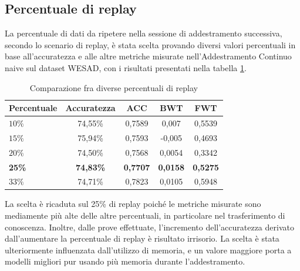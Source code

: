 \subsection{Percentuale di replay}
La percentuale di dati da ripetere nella sessione di addestramento successiva, secondo lo scenario di replay, è stata scelta provando diversi valori percentuali in base all'accuratezza e alle altre metriche misurate nell'Addestramento Continuo naive sul dataset WESAD, con i risultati presentati nella tabella \ref{tab:replayperctest}.\\
\begin{table}[h]
    \begin{center}
        \begin{tabular}{l|c|c|c|c}
            \textbf{Percentuale} & \textbf{Accuratezza} & \textbf{ACC} & \textbf{BWT} & \textbf{FWT}\\
            \hline
            $10\%$ & 74,55\% & 0,7589 & 0,007 & 0,5539\\
            $15\%$ & 75,94\% & 0,7593 & -0,005 & 0,4693\\
            $20\%$ & 74,50\% & 0,7568 & 0,0054 & 0,3342\\
            \textbf{25\%} & \textbf{74,83\%} & \textbf{0,7707} & \textbf{0,0158} & \textbf{0,5275}\\
            $33\%$ & 74,71\% & 0,7823 & 0,0105 & 0,5948\\
        \end{tabular}
        \caption{Comparazione fra diverse percentuali di replay}
        \label{tab:replayperctest}
    \end{center}
\end{table}
La scelta è ricaduta sul 25\% di replay poiché le metriche misurate sono mediamente più alte delle altre percentuali, in particolare nel trasferimento di conoscenza. Inoltre, dalle prove effettuate, l'incremento dell'accuratezza derivato dall'aumentare la percentuale di replay è risultato irrisorio. La scelta è stata ulteriormente influenzata dall'utilizzo di memoria, e un valore maggiore porta a modelli migliori pur usando più memoria durante l'addestramento.
